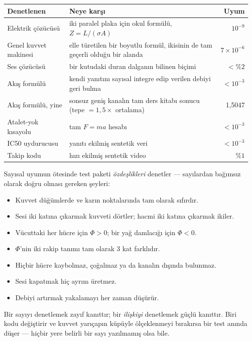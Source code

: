 \documentclass[11pt,a4paper]{article}
\begin{document}
\begin{center}\small
\begin{tabular}{p{5.1cm}p{4.9cm}r}
\toprule
\textbf{Denetlenen} & \textbf{Neye karşı} & \textbf{Uyum} \\
\midrule
Elektrik çözücüsü & iki paralel plaka için okul formülü, $Z=L/(\sigma A)$ & $10^{-9}$ \\[3pt]
Genel kuvvet makinesi & elle türetilen bir boyutlu formül, ikisinin de tam
geçerli olduğu bir alanda & $7\times10^{-6}$ \\[3pt]
Ses çözücüsü & bir kutudaki duran dalganın bilinen biçimi & $<\%2$ \\[3pt]
Akış formülü & kendi yanıtını sayısal integre edip verilen debiyi geri bulma & $<10^{-3}$ \\[3pt]
Akış formülü, yine & sonsuz geniş kanalın tam ders kitabı sonucu (tepe $=1{,}5\times$ ortalama) & 1,5047 \\[3pt]
Atalet-yok kısayolu & tam $F=ma$ hesabı & $<10^{-3}$ \\[3pt]
IC50 uydurucusu & yanıtı ekilmiş sentetik veri & $<10^{-3}$ \\[3pt]
Takip kodu & hızı ekilmiş sentetik video & $\%1$ \\
\bottomrule
\end{tabular}
\end{center}

Sayısal uyumun ötesinde test paketi \emph{özdeşlikleri} denetler --- sayılardan
bağımsız olarak doğru olması gereken şeyleri:

\begin{itemize}
\item Kuvvet düğümlerde ve karın noktalarında tam olarak sıfırdır.
\item Sesi iki katına çıkarmak kuvveti dörtler; hacmi iki katına çıkarmak ikiler.
\item Vücuttaki her hücre için $\Phi>0$; bir yağ damlacığı için $\Phi<0$.
\item $\Phi$'nin iki rakip tanımı tam olarak 3 kat farklıdır.
\item Hiçbir hücre kaybolmaz, çoğalmaz ya da kanalın dışında bulunmaz.
\item Sesi kapatmak hiç ayrım üretmez.
\item Debiyi artırmak yakalamayı her zaman düşürür.
\end{itemize}

\begin{plain}
Bir sayıyı denetlemek zayıf kanıttır; bir \emph{ilişkiyi} denetlemek güçlü
kanıttır. Biri kodu değiştirir ve kuvvet yarıçapın küpüyle ölçeklenmeyi bırakırsa
bir test anında düşer --- hiçbir yere belirli bir sayı yazılmamış olsa bile.
\end{plain}
\end{document}
